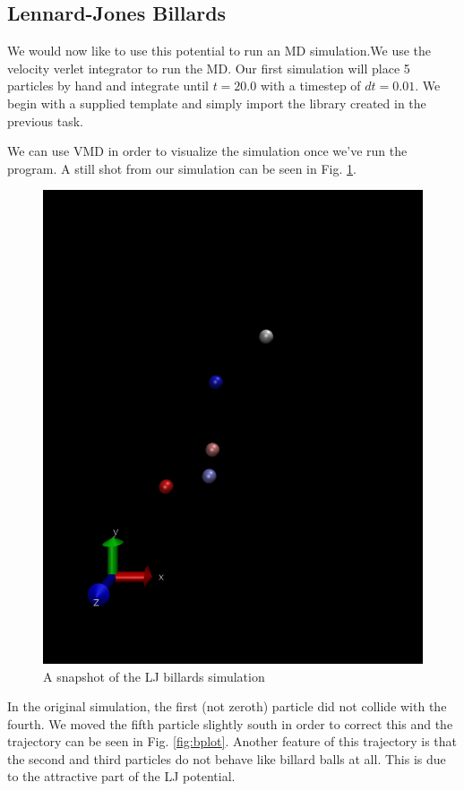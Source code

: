 \documentclass[11pt,a4paper]{scrartcl}
\makeatletter
\newcommand{\listfile}[7][MyPythonStyle]{
}
\makeatother
\begin{document}
\subsection{Lennard-Jones Billards}
We would now like to use this potential to run an MD simulation.We use the velocity verlet integrator to run the MD. Our first simulation will place 5 particles by hand and integrate until $t = 20.0$ with a timestep of $dt = 0.01$. We begin with a supplied template and simply import the library created in the previous task.  
\listfile{../src/ljbillards.py}{/src/ljbillards.py}{1}{3}{Import ljlib.py}{imports}
We can use VMD in order to visualize the simulation once we've run the program. A still shot from our simulation can be seen in Fig. \ref{fig:vmd}.
\begin{figure}[h]
\includegraphics[width=0.7\linewidth]{../fig/vmdscene.png}
  \centering
  \caption{A snapshot of the LJ billards simulation}
\label{fig:vmd}
\end{figure}
In the original simulation, the first (not zeroth) particle did not collide with the fourth. We moved the fifth particle slightly south in order to correct this and the trajectory can be seen in Fig. \ref{fig:bplot}. Another feature of this trajectory is that the second and third particles do not behave like billard balls at all. This is due to the attractive part of the LJ potential.
\end{document}
